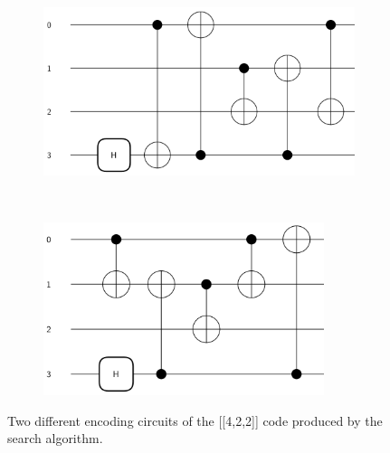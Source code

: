 \documentclass[a4paper,onecolumn,11pt]{quantumarticle}
\begin{document}
\begin{figure}[H]
    \centering
    \begin{subfigure}[b]{0.48\textwidth}
        \includegraphics[width=\textwidth]{Figures/422_searched_1.png}
        \caption{}
        \label{fig:422_first_circ}
    \end{subfigure}
    ~ %
    \begin{subfigure}[b]{0.48\textwidth}
        \includegraphics[width=0.9\textwidth]{Figures/422_searched_2.png}
        \caption{}
        \label{fig:422_second_circ}
    \end{subfigure}
    \caption{Two different encoding circuits of the [[4,2,2]] code produced by the search algorithm.}\label{fig:422_circ}
\end{figure}
\end{document}

